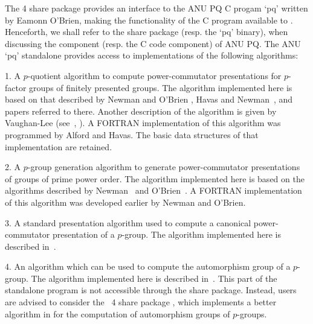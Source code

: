 

The {\GAP} 4 share package {\ANUPQ} provides an interface to the ANU PQ C
progam `pq' written by Eamonn O'Brien, making the functionality of the  C
program available to {\GAP}. Henceforth, we shall refer to  the  {\ANUPQ}
share package  (resp.  the  `pq'  binary),  when  discussing  the  {\GAP}
component (resp. the C code component) of ANU PQ. The ANU `pq' standalone
provides access to implementations of the following algorithms:

\beginlist

\item{1.}
A $p$-quotient algorithm to compute  power-commutator  presentations  for
$p$-factor groups of finitely presented groups. The algorithm implemented
here is based on that described by Newman and O'Brien \cite{NO96},  Havas
and Newman~\cite{HN80}, and papers referred to there. Another description
of  the   algorithm   is   given   by   Vaughan-Lee   (see~\cite{Vau90a},
\cite{Vau90b}). A FORTRAN implementation of this algorithm was programmed
by Alford and Havas. The basic data structures of that implementation are
retained.

\item{2.} 
A   $p$-group   generation   algorithm   to   generate   power-commutator
presentations of groups of prime power order. The  algorithm  implemented
here is based on the  algorithms  described  by  Newman~\cite{New77}  and
O'Brien~\cite{OBr90}. A FORTRAN  implementation  of  this  algorithm  was
developed earlier by Newman and O'Brien.

\item{3.}
A  standard  presentation  algorithm  used   to   compute   a   canonical
power-commutator presentation of a $p$-group. The  algorithm  implemented
here is described in~\cite{OBr94}.

\item{4.} 
An algorithm which can be used to compute the  automorphism  group  of  a
$p$-group. The algorithm implemented here is  described  in~\cite{OBr94}.
This part of  the  standalone  program  is  not  accessible  through  the
{\ANUPQ} share package.  Instead,  users  are  advised  to  consider  the
{\GAP}~4 share package {\AutPGrp}, which implements a better algorithm in
{\GAP} for the computation of automorphism groups of $p$-groups.

